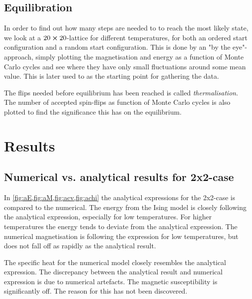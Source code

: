 \documentclass[11pt,a4paper,draft]{article}
\numberwithin{equation}{section}
\begin{document}
\subsection{Equilibration}
In order to find out how many steps are needed to to reach the most likely
state, we look at a 
$20 \cross 20$-lattice for different temperatures,
for both an ordered start configuration
and a random start configuration. 
This is done by an "by the eye"-approach, simply plotting the 
magnetisation and energy as a function of Monte Carlo cycles and see 
where they have only small fluctuations around some mean value. This is 
later used to as the starting point for gathering the data.

The flips needed before equilibrium has been reached is 
called \emph{thermalisation}. The number of accepted spin-flips as 
function of Monte Carlo cycles is also plotted to find the significance 
this has on the equilibrium.

\section{Results}

\subsection{Numerical vs. analytical results for 2x2-case}

In \cref{fig:aE,fig:aM,fig:acv,fig:achi}
 the analytical expressions for the 2x2-case is compared to the numerical.
The energy from the Ising model is closely following the analytical 
expression, especially for low temperatures. For higher temperatures
the energy tends to deviate from the analytical expression. The 
numerical magnetisation is following the expression for low 
temperatures, but does not fall off as rapidly as the analytical result.

The specific heat for the numerical model closely resembles the analytical
expression. The discrepancy between the analytical result and numerical 
expression is due to numerical artefacts. The magnetic susceptibility
is significantly off. The reason for this has not been discovered.
\end{document}
